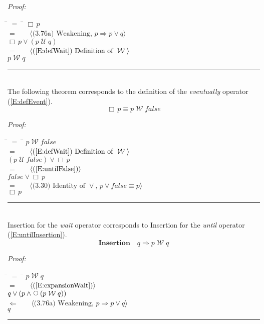 \documentclass[fleqn, leqno]{article}
\newcommand{\lgap}{2pt}                             %
\newcommand{\mymathindent}{24pt}                    %
\newcommand{\impl}{\ensuremath{\Rightarrow}}        %
\newcommand{\foll}{\ensuremath{\Leftarrow}}         %
\newcommand{\Until}{\;\mathcal{U}\;}
\newcommand{\Wait}{\;\mathcal{W}\;}
\newcommand{\Next}{\;\,\text{\raisebox{3.5pt}{\circle{6}}}}
\newcommand{\Always}{\Box\,}
\newcommand{\myqed}{\hfill\rule[-.23ex]{1.2ex}{2.0ex}}
\newcommand{\Gll} {\langle}                         %
\newcommand{\Ggg} {\rangle}                         %
\newcommand{\Hint}[1]     {\ \ \ $\Gll              \mbox{#1} \Ggg$ }   %
\begin{document}
\emph{Proof:}
\begin{tabbing}
\hspace{\mymathindent} \= $= \;$ \= \kill
\> \> $\Always p$\\[\lgap]
\> $=$ \> \Hint{(3.76a) Weakening, $p\impl p\lor q$} \\[\lgap]
\> \> $\Always p \lor (p \Until q)$\\[\lgap]
\> $=$ \> \Hint{(\ref{E:defWait}) Definition of $\Wait$} \\[\lgap]
\> \> $p \Wait q$\\[\lgap]
\end{tabbing}
\myqed\\[\lgap]

The following theorem corresponds to the definition of the \textit{eventually} operator (\ref{E:defEvent}).
\begin{equation}\label{E:alwaysAsWait}
\Always p \equiv p \Wait false
\end{equation}

\emph{Proof:}
\begin{tabbing}
\hspace{\mymathindent} \= $= \;$ \= \kill
\> \> $p \Wait false$\\[\lgap]
\> $=$ \> \Hint{(\ref{E:defWait}) Definition of $\Wait$} \\[\lgap]
\> \> $(p \Until false) \lor \Always p$\\[\lgap]
\> $=$ \> \Hint{(\ref{E:untilFalse})} \\[\lgap]
\> \> $false \lor \Always p$\\[\lgap]
\> $=$ \> \Hint{(3.30) Identity of $\lor$, $p\lor false\equiv p$} \\[\lgap]
\> \> $\Always p$\\[\lgap]
\end{tabbing}
\myqed\\[\lgap]

Insertion for the \textit{wait} operator corresponds to
Insertion for the \textit{until} operator (\ref{E:untilInsertion}).
\begin{equation}\label{E:waitInsertion}
\textbf{Insertion}\quad q \impl p \Wait q
\end{equation}

\emph{Proof:}
\begin{tabbing}
\hspace{\mymathindent} \= $= \;$ \= \kill
\> \> $p \Wait q$\\[\lgap]
\> $=$ \> \Hint{(\ref{E:expansionWait})} \\[\lgap]
\> \> $q \lor (p \land \Next(p \Wait q))$\\[\lgap]
\> $\foll$ \> \Hint{(3.76a) Weakening, $p\impl p\lor q$} \\[\lgap]
\> \> $q$\\[\lgap]
\end{tabbing}
\myqed\\[\lgap]
\end{document}
